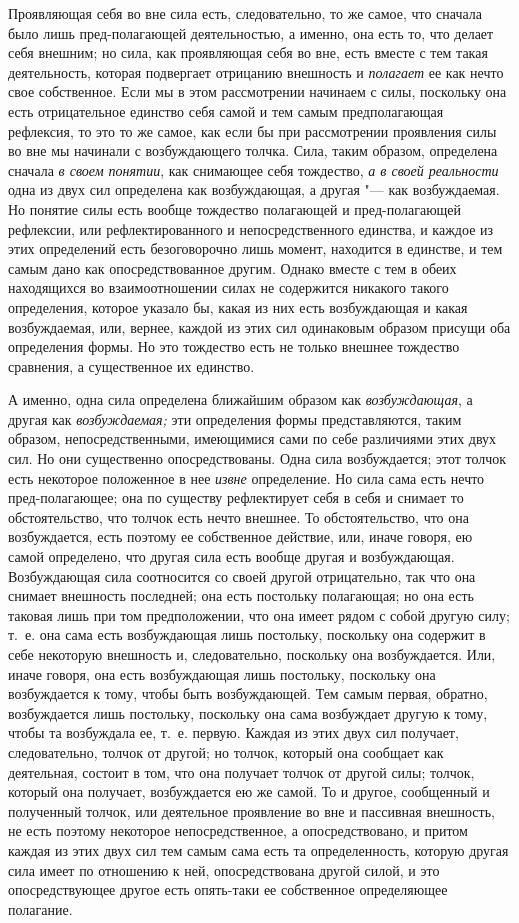 Проявляющая себя во вне сила есть, следовательно, то же самое, что сначала
было лишь пред-полагающей деятельностью, а именно, она есть то, что делает
себя внешним; но сила, как проявляющая себя во вне, есть вместе с тем такая
деятельность, которая подвергает отрицанию внешность и
{\em полагает} ее как нечто свое собственное. Если мы в
этом рассмотрении начинаем с силы, поскольку она есть отрицательное
единство себя самой и тем самым предполагающая рефлексия, то это то же
самое, как если бы при рассмотрении проявления силы во вне мы начинали с
возбуждающего толчка. Сила, таким образом, определена сначала
{\em в своем понятии}, как снимающее себя тождество,
{\em а в своей реальности} одна из двух сил определена
как возбуждающая, а другая "--- как возбуждаемая. Но понятие силы есть вообще
тождество полагающей и пред-полагающей рефлексии, или рефлектированного и
непосредственного единства, и каждое из этих определений есть безоговорочно
лишь момент, находится в единстве, и тем самым дано как опосредствованное
другим. Однако вместе с тем в обеих находящихся во взаимоотношении силах не
содержится никакого такого определения, которое указало бы, какая из них
есть возбуждающая и какая возбуждаемая, или, вернее, каждой из этих сил
одинаковым образом присущи оба определения формы. Но это тождество есть не
только внешнее тождество сравнения, а существенное их единство.

А именно, одна сила определена ближайшим образом как
{\em возбуждающая}, а другая как {\em возбуждаемая;} эти определения формы
представляются, таким образом, непосредственными, имеющимися сами по себе
различиями этих двух сил. Но они существенно опосредствованы. Одна сила
возбуждается; этот толчок есть некоторое положенное в нее
{\em извне} определение. Но сила сама есть нечто
пред-полагающее; она по существу рефлектирует себя в себя и снимает то
обстоятельство, что толчок есть нечто внешнее. То обстоятельство, что она
возбуждается, есть поэтому ее собственное действие, или, иначе говоря, ею
самой определено, что другая сила есть вообще другая и возбуждающая.
Возбуждающая сила соотносится со своей другой отрицательно, так что она
снимает внешность последней; она есть постольку полагающая; но она есть
таковая лишь при том предположении, что она имеет рядом с собой другую
силу; т.~е. она сама есть возбуждающая лишь постольку, поскольку она
содержит в себе некоторую внешность и, следовательно, поскольку она
возбуждается. Или, иначе говоря, она есть возбуждающая лишь постольку,
поскольку она возбуждается к тому, чтобы быть возбуждающей. Тем самым
первая, обратно, возбуждается лишь постольку, поскольку она сама возбуждает
другую к тому, чтобы та возбуждала ее, т.~е. первую. Каждая из этих двух
сил получает, следовательно, толчок от другой; но толчок, который она
сообщает как деятельная, состоит в том, что она получает толчок от другой
силы; толчок, который она получает, возбуждается ею же самой. То и другое,
сообщенный и полученный толчок, или деятельное проявление во вне и
пассивная внешность, не есть поэтому некоторое непосредственное, а
опосредствовано, и притом каждая из этих двух сил тем самым сама есть та
определенность, которую другая сила имеет по отношению к ней,
опосредствована другой силой, и это опосредствующее другое есть опять-таки
ее собственное определяющее полагание.

